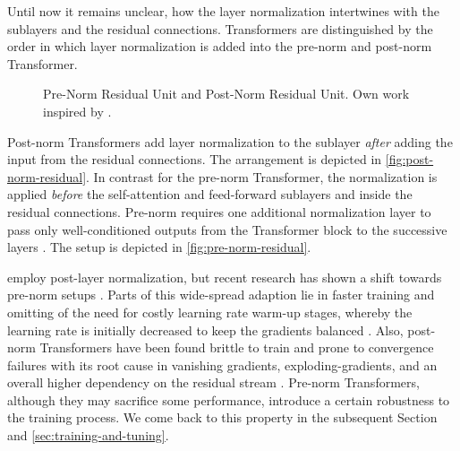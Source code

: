 Until now it remains unclear, how the layer normalization intertwines with the sublayers and the residual connections. Transformers are distinguished by the order in which layer normalization is added into the pre-norm and post-norm Transformer.
\begin{figure}[ht]
    \hfill
    \hfill
    \hfill\null
    \caption[Variants of Layer Norm in Transformer]{Pre-Norm Residual Unit and Post-Norm Residual Unit. Own work inspired by \textcite[][2]{wangLearningDeepTransformer2019}.}
    \label{fig:norm-residual}
\end{figure}

Post-norm Transformers add layer normalization to the sublayer \emph{after} adding the input from the residual connections. The arrangement is depicted in \cref{fig:post-norm-residual}. In contrast for the pre-norm Transformer, the normalization is applied \emph{before} the self-attention and feed-forward sublayers and inside the residual connections. Pre-norm requires one additional normalization layer to pass only well-conditioned outputs from the Transformer block to the successive layers \autocite[][5]{xiongLayerNormalizationTransformer2020}. The setup is depicted in \cref{fig:pre-norm-residual}.

\textcite[][3]{vaswaniAttentionAllYou2017} employ post-layer normalization, but recent research has shown a shift towards pre-norm setups \autocite[][4]{narangTransformerModificationsTransfer2021}. Parts of this wide-spread adaption lie in faster training and omitting of the need for costly learning rate warm-up stages, whereby the learning rate is initially decreased to keep the gradients balanced \autocites[][2]{xiongLayerNormalizationTransformer2020}[][8]{liuUnderstandingDifficultyTraining2020}. Also, post-norm Transformers have been found brittle to train and prone to convergence failures with its root cause in vanishing gradients, \glspl{exploding-gradient}, and an overall higher dependency on the residual stream \autocites[][8]{liuUnderstandingDifficultyTraining2020}[][1812]{wangLearningDeepTransformer2019}. Pre-norm Transformers, although they may sacrifice some performance, introduce a certain robustness to the training process. We come back to this property in the subsequent Section and \cref{sec:training-and-tuning}.

